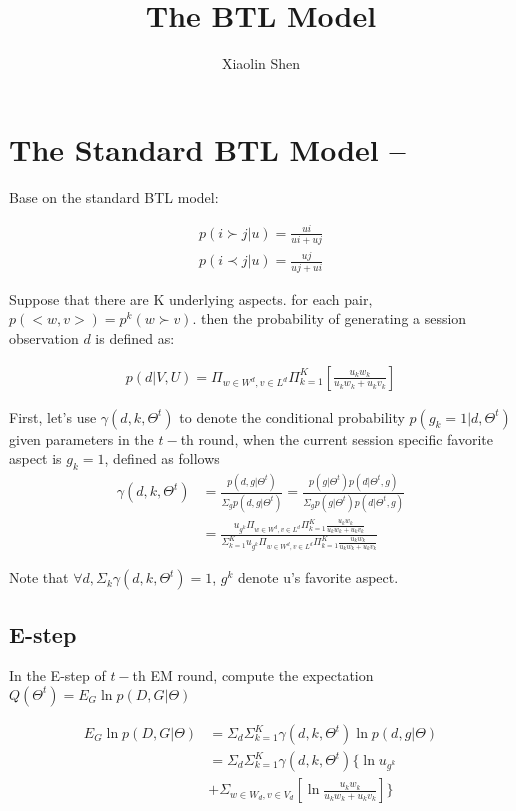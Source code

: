 \documentclass{article}
\title{The BTL Model}
\author{Xiaolin Shen}
\begin{document}
\maketitle


\section{The Standard BTL Model --}
Base on the standard BTL model:

\begin{align*}
	p(i \succ j |u)=\frac{ui}{ui+ uj} \\
	p(i \prec j |u)=\frac{uj}{uj+ ui} 
\end{align*}

 Suppose that there are K underlying aspects. for each pair, $p(<w,v>) = p^k(w\succ v) $. then the probability of generating a session observation $d$ is defined as:

\begin{align}\label{equ:skyline}
p(d|V,U)
=\Pi_{w\in W^d, v\in L^d} \Pi_{k=1}^{K}[ {\frac{u_k w_k}{u_k w_k+u_k v_k}}]
\end{align}


First, let's use  $\gamma(d,k,\Theta^t)$ to denote the conditional probability $p(g_k=1|d,\Theta^t)$ given parameters in the $t-$th round, when the current session specific favorite aspect is $g_k=1$, defined as follows
\begin{align}\label{equ:conditional}
\gamma(d,k,\Theta^t) &=\frac{p(d,g|\Theta^t)}{\Sigma_g p(d,g|\Theta^t)} = \frac{p(g|\Theta^t)p(d|\Theta^t,g)}{\Sigma_g p(g|\Theta^t)p(d|\Theta^t,g)}\\\nonumber
&=\frac{u_{g^k} \Pi_{w \in W^d, v\in L^d} \Pi_{k=1}^{K}\frac{u_k w_k}{u_k w_k+u_k v_k}}{\Sigma_{k=1}^K u_{g^k} \Pi_{w \in W^d, v\in L^d} \Pi_{k=1}^{K}\frac{u_k w_k}{u_k w_k+u_k v_k}}
\end{align}

Note that $\forall d, \Sigma_k \gamma(d,k,\Theta^t)=1$, $g^k$ denote u's favorite aspect.

\subsection{E-step}
 In the E-step of $t-$th  EM round, compute the expectation $Q(\Theta^t)=E_{G} \ln p(D,G|\Theta) $

\begin{align}\label{equ:estep}
E_{G} \ln p(D,G|\Theta) & =\Sigma_{d} \Sigma_{k=1}^K \gamma(d,k,\Theta^t) \ln p(d,g|\Theta)\\ \nonumber
& = \Sigma_d \Sigma_{k=1}^K \gamma(d,k,\Theta^t) \{ \ln u_{g^k}  \\ \nonumber
&+ \Sigma_{w\in W_d, v\in V_d}[\ln \frac{u_k w_k}{u_k w_k+u_k v_k}] \}
\end{align}
\end{document}
